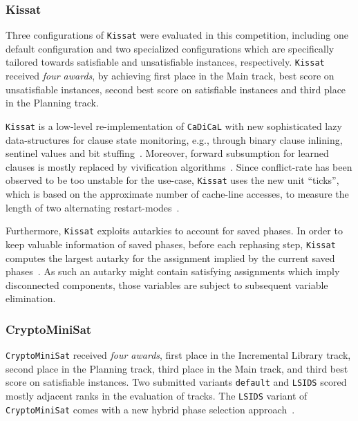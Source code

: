 \documentclass{elsarticle}
\newcommand{\solver}[1]{\texttt{#1}}
\begin{document}
\subsubsection{Kissat} 
\label{sec:kissat}

Three configurations of \solver{Kissat} were evaluated in this competition, including one default configuration and two specialized configurations which are specifically tailored towards satisfiable and unsatisfiable instances, respectively. 
\solver{Kissat} received \emph{four awards}, by achieving first place in the Main track, best score on unsatisfiable instances, second best score on satisfiable instances and third place in the Planning track. 

\solver{Kissat} is a low-level re-implementation of \solver{CaDiCaL} with new sophisticated lazy data-structures for clause state monitoring, e.g., through binary clause inlining, sentinel values and bit stuffing~\cite{Biere:SC2019,Biere:SC2020}. 
Moreover, forward subsumption for learned clauses is mostly replaced by vivification algorithms~\cite{ChuMinLi:2020:Vivification}. 
Since conflict-rate has been observed to be too unstable for the use-case, \solver{Kissat} uses the new unit ``ticks'', which is based on the approximate number of cache-line accesses, to measure the length of two alternating restart-modes~\cite{Biere:SC2020}. 

Furthermore, \solver{Kissat} exploits autarkies to account for saved phases. 
In order to keep valuable information of saved phases, before each rephasing step, \solver{Kissat} computes the largest autarky for the assignment implied by the current saved phases~\cite{Kiesl:2019:Autarkies}. 
As such an autarky might contain satisfying assignments which imply disconnected components, those variables are subject to subsequent variable elimination. 


\subsubsection{CryptoMiniSat}
\label{sec:cryptominisat}

\solver{CryptoMiniSat} received \emph{four awards}, first place in the Incremental Library track, second place in the Planning track, third place in the Main track, and third best score on satisfiable instances. 
Two submitted variants \solver{default} and \solver{LSIDS} scored mostly adjacent ranks in the evaluation of tracks. 
The \solver{LSIDS} variant of \solver{CryptoMiniSat} comes with a new hybrid phase selection approach~\cite{Shaw:2020:LSIDS,Soos:SC2020}.
\end{document}
